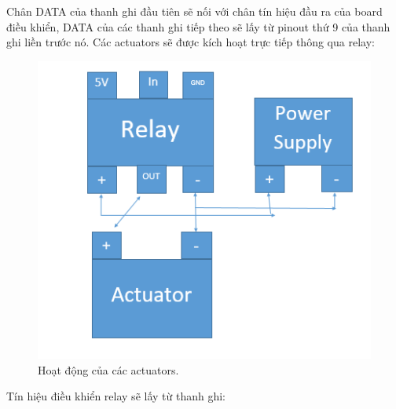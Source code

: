 \documentclass[a4paper,12pt,oneside]{article}
\begin{document}
\noindent Chân DATA của thanh ghi đầu tiên sẽ nối với chân tín hiệu đầu ra của board điều khiển, DATA của các thanh ghi tiếp theo sẽ lấy từ pinout thứ 9 của thanh ghi liền trước nó.
\noindent Các actuators sẽ được kích hoạt trực tiếp thông qua relay:
\begin{center}
\begin{figure}[h!]
\begin{center}
\includegraphics[scale=0.9]{hinh/actuator.PNG}
\end{center}
\caption{Hoạt động của các actuators.}
\end{figure}
\end{center}
\noindent Tín hiệu điều khiển relay sẽ lấy từ thanh ghi:
\end{document}
